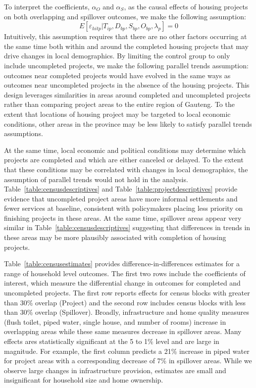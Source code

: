 \documentclass[12pt]{article}
\begin{document}
To interpret the coefficients, $\alpha_O$ and $\alpha_S$, as the causal effects of housing projects on both overlapping and spillover outcomes, we make the following assumption:
\begin{equation*}
E[\varepsilon_{hitp}|T_{ip},D_{bp},S_{bp},O_{bp},\lambda_p]=0
\end{equation*}
Intuitively, this assumption requires that there are no other factors occurring at the same time both within and around the completed housing projects that may drive changes in local demographics.  By limiting the control group to only include uncompleted projects, we make the following parallel trends assumption: outcomes near completed projects would have evolved in the same ways as outcomes near uncompleted projects in the absence of the housing projects.  This design leverages similarities in areas around completed and uncompleted projects rather than comparing project areas to the entire region of Gauteng.  To the extent that locations of housing project may be targeted to local economic conditions, other areas in the province may be less likely to satisfy parallel trends assumptions.  

At the same time, local economic and political conditions may determine which projects are completed and which are either canceled or delayed.  To the extent that these conditions may be correlated with changes in local demographics, the assumption of parallel trends would not hold in the analysis.  Table~\ref{table:censusdescriptives} and Table~\ref{table:projectdescriptives} provide evidence that uncompleted project areas have more informal settlements and fewer services at baseline, consistent with policymakers placing less priority on finishing projects in these areas.  At the same time, spillover areas appear very similar in Table~\ref{table:censusdescriptives} suggesting that differences in trends in these areas may be more plausibly associated with completion of housing projects.  

Table~\ref{table:censusestimates} provides difference-in-differences estimates for a range of household level outcomes.  The first two rows include the coefficients of interest, which measure the differential change in outcomes for completed and uncompleted projects.  The first row reports effects for census blocks with greater than 30\% overlap (Project) and the second row includes census blocks with less than 30\% overlap (Spillover).  Broadly, infrastructure and home quality measures (flush toilet, piped water, single house, and number of rooms) increase in overlapping areas while these same measures decrease in spillover areas.  Many effects ares statistically significant at the 5 to 1\% level and are large in magnitude.  For example, the first column predicts a 21\% increase in piped water for project areas with a corresponding decrease of 7\% in spillover areas.  While we observe large changes in infrastructure provision, estimates are small and insignificant for household size and home ownership.
\end{document}
